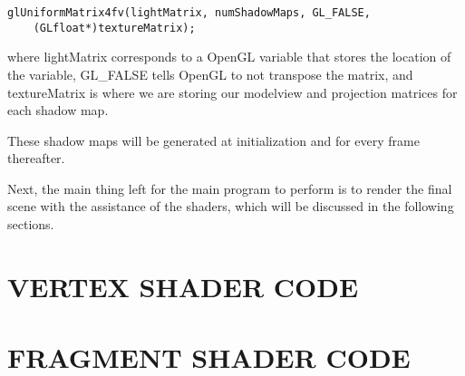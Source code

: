 \begin{lstlisting}
glUniformMatrix4fv(lightMatrix, numShadowMaps, GL_FALSE, 
	(GLfloat*)textureMatrix);
\end{lstlisting}

where lightMatrix corresponds to a OpenGL variable that stores the location of the variable, GL\_FALSE tells OpenGL to not transpose the matrix, and textureMatrix is where we are storing our modelview and projection matrices for each shadow map.

These shadow maps will be generated at initialization and for every frame thereafter.  

Next, the main thing left for the main program to perform is to render the final scene with the assistance of the shaders, which will be discussed in the following sections.

\section{VERTEX SHADER CODE}

\section{FRAGMENT SHADER CODE}




